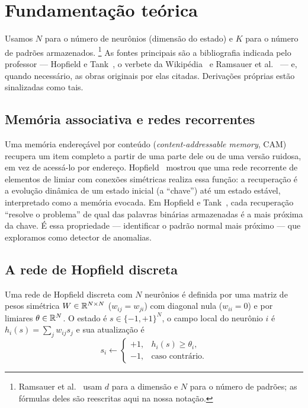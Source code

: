 \section{Fundamentação teórica}\label{sec:teoria}

Usamos $N$ para o número de neurônios (dimensão do estado) e $K$ para o número de padrões armazenados.%
\footnote{Ramsauer et al.~\cite{ramsauer2021} usam $d$ para a dimensão e $N$ para o número de padrões; as
fórmulas deles são reescritas aqui na nossa notação.}
As fontes principais são a bibliografia indicada pelo professor --- Hopfield e Tank~\cite{hopfieldtank1985},
o verbete da Wikipédia~\cite{wikihopfield} e Ramsauer et al.~\cite{ramsauer2021} --- e, quando necessário, as
obras originais por elas citadas. Derivações próprias estão sinalizadas como tais.

\subsection{Memória associativa e redes recorrentes}
Uma memória endereçável por conteúdo (\emph{content-addressable memory}, CAM) recupera um item completo a
partir de uma parte dele ou de uma versão ruidosa, em vez de acessá-lo por endereço. Hopfield~\cite{hopfield1982}
mostrou que uma rede recorrente de elementos de limiar com conexões simétricas realiza essa função: a
recuperação é a evolução dinâmica de um estado inicial (a ``chave'') até um estado estável, interpretado como
a memória evocada. Em Hopfield e Tank~\cite[p.~144]{hopfieldtank1985}, cada recuperação ``resolve o problema''
de qual das palavras binárias armazenadas é a mais próxima da chave. É essa propriedade --- identificar o
padrão normal mais próximo --- que exploramos como detector de anomalias.

\subsection{A rede de Hopfield discreta}\label{sec:discreta}
\begin{definicao}
Uma rede de Hopfield discreta com $N$ neurônios é definida por uma matriz de pesos simétrica
$W\in\mathbb{R}^{N\times N}$ ($w_{ij}=w_{ji}$) com diagonal nula ($w_{ii}=0$) e por limiares $\theta\in\mathbb{R}^{N}$. O
estado é $s\in\{-1,+1\}^{N}$, o campo local do neurônio $i$ é $h_i(s)=\sum_{j}w_{ij}s_j$ e sua atualização é
\begin{equation}\label{eq:update}
s_i\leftarrow\begin{cases}+1,& h_i(s)\ge\theta_i,\\ -1,& \text{caso contrário.}\end{cases}
\end{equation}
\end{definicao}


